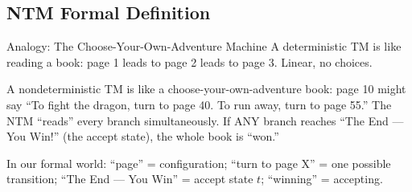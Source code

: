 \documentclass[11pt,a4paper]{article}
\begin{document}
\subsection{NTM Formal Definition}

\begin{notebox}{Analogy: The Choose-Your-Own-Adventure Machine}
A deterministic TM is like reading a book: page 1 leads to page 2 leads to page 3. Linear, no choices.

A nondeterministic TM is like a choose-your-own-adventure book: page 10 might say ``To fight the dragon, turn to page 40. To run away, turn to page 55.'' The NTM ``reads'' every branch simultaneously. If ANY branch reaches ``The End --- You Win!'' (the accept state), the whole book is ``won.''

In our formal world: ``page'' = configuration; ``turn to page X'' = one possible transition; ``The End --- You Win'' = accept state $t$; ``winning'' = accepting.
\end{notebox}
\end{document}

